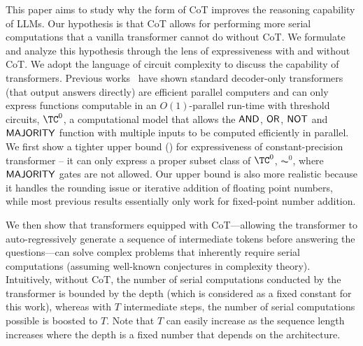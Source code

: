 This paper aims to study why the form of CoT improves the reasoning capability of LLMs. Our hypothesis is that CoT allows for performing more serial computations that a vanilla transformer cannot do without CoT. We formulate and analyze this hypothesis through the lens of expressiveness with and without CoT. We adopt the language of circuit complexity to discuss the capability of transformers. Previous works~\citep{liu2022towards,merrill2023parallelism} have shown standard decoder-only transformers (that output answers directly) are efficient parallel computers and can only express functions computable in an $O(1)$-parallel run-time with threshold circuits, $\TC^0$, a computational model that allows the $\mathsf{AND}$, $\mathsf{OR}$, $\mathsf{NOT}$ and $\mathsf{MAJORITY}$ function with multiple inputs to be computed efficiently in parallel. 
We first show a tighter upper bound () for expressiveness of constant-precision transformer -- it can only express a proper subset class of $\TC^0$, $\AC^0$, where $\mathsf{MAJORITY}$ gates are not allowed. Our upper bound is also more realistic because it handles the rounding issue or iterative addition of floating point numbers, while most previous results essentially only work for fixed-point number addition.


We then show that transformers equipped with CoT---allowing the transformer to auto-regressively generate a sequence of intermediate tokens before answering the questions---can solve complex problems that inherently require serial computations (assuming well-known conjectures in complexity theory). Intuitively, without CoT, the number of serial computations conducted by the transformer is bounded by the depth (which is considered as a fixed constant for this work), whereas with $T$ intermediate steps, the number of serial computations possible is boosted to $T$. Note that $T$ can easily increase as the sequence length increases where the depth is a fixed number that depends on the architecture. 

